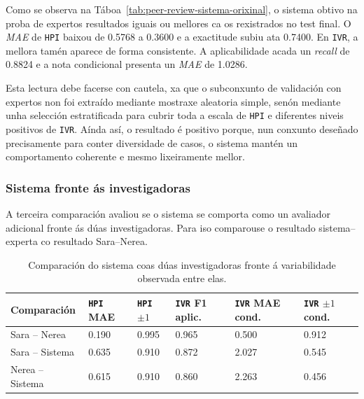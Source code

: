 Como se observa na Táboa~\ref{tab:peer-review-sistema-orixinal}, o sistema obtivo na proba de
expertos resultados iguais ou mellores ca os rexistrados no test final. O \textit{MAE} de
\texttt{HPI} baixou de 0.5768 a 0.3600 e a exactitude subiu ata 0.7400. En \texttt{IVR}, a mellora
tamén aparece de forma consistente. A
aplicabilidade acada un \textit{recall} de 0.8824 e a nota condicional presenta un \textit{MAE}
de 1.0286.

Esta lectura debe facerse con cautela, xa que o subconxunto de validación con expertos non foi
extraído mediante mostraxe aleatoria simple, senón mediante unha selección estratificada para cubrir
toda a escala de \texttt{HPI} e diferentes niveis positivos de \texttt{IVR}. Aínda así, o resultado
é positivo porque, nun conxunto deseñado precisamente para conter diversidade de casos, o sistema
mantén un comportamento coherente e mesmo lixeiramente mellor.

\subsubsection{Sistema fronte ás investigadoras}
A terceira comparación avaliou se o sistema se comporta como un avaliador adicional fronte ás dúas
investigadoras. Para iso comparouse o resultado sistema--experta co resultado Sara--Nerea.

{
\begin{table}[htbp]
    \centering
    \scriptsize
    \setlength{\tabcolsep}{3pt}
    \begin{tabular}{p{}|p{}|p{}|p{}|p{}|p{}}
        \rowcolor{udcpink!25}
        \textbf{Comparación} & \textbf{\texttt{HPI} MAE} & \textbf{\texttt{HPI} $\pm 1$} & \textbf{\texttt{IVR} F1 aplic.} & \textbf{\texttt{IVR} MAE cond.} & \textbf{\texttt{IVR} $\pm 1$ cond.} \\\hline
        Sara -- Nerea & 0.190 & 0.995 & 0.965 & 0.500 & 0.912 \\
        Sara -- Sistema & 0.635 & 0.910  & 0.872 & 2.027 & 0.545 \\
        Nerea -- Sistema & 0.615 & 0.910  & 0.860 & 2.263 & 0.456 \\
    \end{tabular}
    \caption{Comparación do sistema coas dúas investigadoras fronte á variabilidade observada entre elas.}
    \label{tab:peer-review-sistema-expertas}
\end{table}
}

